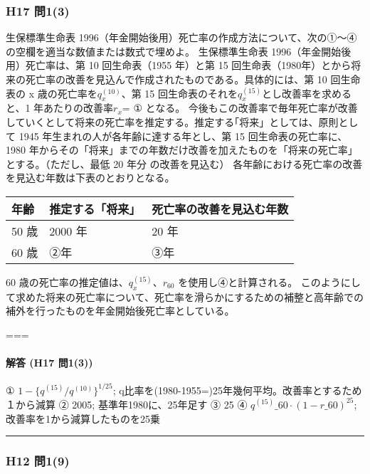 \documentclass[
]{article}
\begin{document}
\hypertarget{h17-ux554f13}{%
\subsubsection{H17 問1(3)}\label{h17-ux554f13}}

生保標準生命表
1996（年金開始後用）死亡率の作成方法について、次の①～④の空欄を適当な数値または数式で埋めよ。
生保標準生命表 1996（年金開始後用）死亡率は、第 10 回生命表（1955
年）と第 15
回生命表（1980年）とから将来の死亡率の改善を見込んで作成されたものである。具体的には、第
10 回生命表の x 歳の死亡率を\(q_x^{(10)}\)、第 15
回生命表のそれを\(q_x^{(15)}\)とし改善率を求めると、1
年あたりの改善率\(r_x\)= ① となる。
今後もこの改善率で毎年死亡率が改善していくとして将来の死亡率を推定する。推定する｢将来」としては、原則として
1945 年生まれの人が各年齢に達する年とし、第 15 回生命表の死亡率に、1980
年からその「将来」までの年数だけ改善を加えたものを「将来の死亡率」とする。（ただし、最低
20 年分 の改善を見込む）
各年齢における死亡率の改善を見込む年数は下表のとおりとなる。

\begin{longtable}[]{@{}lll@{}}
\toprule
年齢 & 推定する「将来」 & 死亡率の改善を見込む年数\tabularnewline
\midrule
\endhead
50 歳 & 2000 年 & 20 年\tabularnewline
60 歳 & ②年 & ③年\tabularnewline
\bottomrule
\end{longtable}

60 歳の死亡率の推定値は、\(q_x^{(15)}\)、\(r_{60}\)
を使用し④と計算される。
このようにして求めた将来の死亡率について、死亡率を滑らかにするための補整と高年齢での補外を行ったものを年金開始後死亡率としている。

===

\hypertarget{ux89e3ux7b54-h17-ux554f13}{%
\paragraph{解答 (H17 問1(3))}\label{ux89e3ux7b54-h17-ux554f13}}

① \(1-\{q^{(15)}/q^{(10)}\}^{1/25}\);
q比率を(1980-1955=)25年幾何平均。改善率とするため１から減算 ② 2005;
基準年1980に、25年足す ③ 25 ④ \(q^{(15)}\_{60}\cdot(1-r\_{60})^{25}\);
改善率を1から減算したものを25乗

\begin{center}\rule{0.5\linewidth}{0.5pt}\end{center}

\hypertarget{h12-ux554f19}{%
\subsubsection{H12 問1(9)}\label{h12-ux554f19}}
\end{document}
